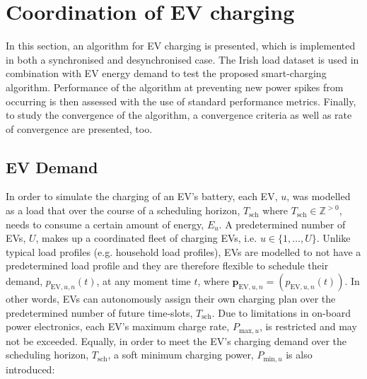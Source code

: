 \section{Coordination of EV charging}
\label{ch3:sec:ev-coordination}

In this section, an algorithm for EV charging is presented, which is implemented in both a synchronised and desynchronised case.
The Irish load dataset \cite{IrishData2002} is used in combination with EV energy demand to test the proposed smart-charging algorithm.
Performance of the algorithm at preventing new power spikes from occurring is then assessed with the use of standard performance metrics.
Finally, to study the convergence of the algorithm, a convergence criteria as well as rate of convergence are presented, too.

\subsection{EV Demand}



In order to simulate the charging of an EV's battery, each EV, $u$, was modelled as a load that over the course of a scheduling horizon, $T_\text{sch}$ where $T_\text{sch} \in \mathbb{Z}^{>0}$, needs to consume a certain amount of energy, $E_u$.
A predetermined number of EVs, $U$, makes up a coordinated fleet of charging EVs, i.e. $u \in \{1, \dots, U\}$.
Unlike typical load profiles (e.g. household load profiles), EVs are modelled to not have a predetermined load profile and they are therefore flexible to schedule their demand, $p_{\text{EV},u,n}(t)$, at any moment time $t$, where $\textbf{p}_{\text{EV},u,n} = (p_{\text{EV},u,n}(t))$.
In other words, EVs can autonomously assign their own charging plan over the predetermined number of future time-slots, $T_\text{sch}$.
Due to limitations in on-board power electronics, each EV's maximum charge rate, $P_{\text{max},u}$, is restricted and may not be exceeded.
Equally, in order to meet the EV's charging demand over the scheduling horizon, $T_\text{sch}$, a soft minimum charging power, $P_{\text{min},u}$ is also introduced:

